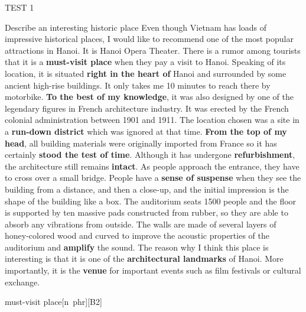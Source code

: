 \begin{glossarymc}[Cambridge 4]
\begin{test}{TEST 1}
\begin{qa}{Describe an interesting historic place}
	Even though Vietnam has loads of impressive historical places, I would like to recommend one of the most popular attractions in Hanoi. It is Hanoi Opera Theater. There is a rumor among tourists that it is a \textbf{must-visit place} when they pay a visit to Hanoi. Speaking of its location, it is situated \textbf{right in the heart of} Hanoi and surrounded by some ancient high-rise buildings. It only takes me 10 minutes to reach there by motorbike. \textbf{To the best of my knowledge}, it was also designed by one of the legendary figures in French architecture industry. It was erected by the French colonial administration between 1901 and 1911. The location chosen was a site in a \textbf{run-down district} which was ignored at that time. \textbf{From the top of my head}, all building materials were originally imported from France so it has certainly \textbf{stood the test of time}. Although it has undergone \textbf{refurbishment}, the architecture still remains \textbf{intact}. As people approach the entrance, they have to cross over a small bridge. People have a \textbf{sense of suspense} when they see the building from a distance, and then a close-up, and the initial impression is the shape of the building like a box. The auditorium seats 1500 people and the floor is supported by ten massive pads constructed from rubber, so they are able to absorb any vibrations from outside. The walls are made of several layers of honey-colored wood and curved to improve the acoustic properties of the auditorium and \textbf{amplify} the sound. The reason why I think this place is interesting is that it is one of the \textbf{architectural landmarks} of Hanoi. More importantly, it is the \textbf{venue} for important events such as film festivals or cultural exchange.
	\end{qa}


        \begin{VocabExplain}[Part 2]
					
			\begin{ExplainCard}{must-visit place}[n~phr][B2]
			\end{ExplainCard}


\end{VocabExplain}
\end{test}
\end{glossarymc}
